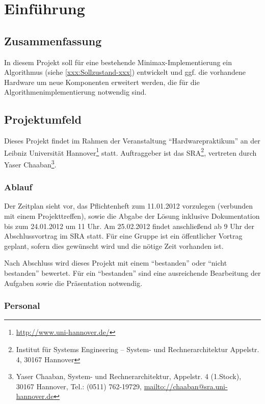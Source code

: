 \chapter{Einführung}
\label{chapter:Pflichtenheft-Einfuehrung}

\section{Zusammenfassung}
\label{section:Pflichtenheft-Einfuehrung-Zusammenfassung}

In diesem Projekt soll für eine bestehende Minimax-Implementierung ein Algorithmus (siehe \ref{xxx:Sollzustand-xxx}) entwickelt und ggf. die vorhandene Hardware um neue Komponenten erweitert werden, die für die Algorithmenimplementierung notwendig sind.

\section{Projektumfeld}
\label{section:Pflichtenheft-Einfuehrung-Projektumfeld}

Dieses Projekt findet im Rahmen der Veranstaltung "`Hardwarepraktikum"' an der Leibniz Universität Hannover\footnote{\url{http://www.uni-hannover.de/}} statt. Auftraggeber ist das SRA\footnote{Institut für Systems Engineering -- System- und Rechnerarchitektur Appelstr. 4, 30167 Hannover}, vertreten durch Yaser Chaaban\footnote{Yaser Chaaban, System- und Rechnerarchitektur, Appelstr. 4 (1.Stock), 30167 Hannover, Tel.: (0511) 762-19729, \url{mailto://chaaban@sra.uni-hannover.de}}.

\subsection{Ablauf}
\label{subsection:Pflichtenheft-Einfuehrung-Projektumfeld-Ablauf}

Der Zeitplan sieht vor, das Pflichtenheft zum 11.01.2012 vorzulegen (verbunden mit einem Projekttreffen), sowie die Abgabe der Lösung inklusive Dokumentation bis zum 24.01.2012 um 11 Uhr. Am 25.02.2012 findet anschließend ab 9 Uhr der Abschlussvortrag im SRA statt. Für eine Gruppe ist ein öffentlicher Vortrag geplant, sofern dies gewünscht wird und die nötige Zeit vorhanden ist.

Nach Abschluss wird dieses Projekt mit einem "`bestanden"' oder "`nicht bestanden"' bewertet. Für ein "`bestanden"' sind eine ausreichende Bearbeitung der Aufgaben sowie die Präsentation notwendig.

\subsection{Personal}
\label{subsection:Pflichtenheft-Einfuehrung-Projektumfeld-Personal}

